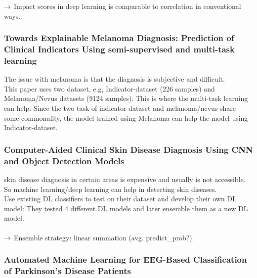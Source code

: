 $\rightarrow$ Impact scores in deep learning is comparable to correlation in conventional ways.

\subsubsection{Towards Explainable Melanoma Diagnosis: Prediction of Clinical Indicators Using semi-supervised and multi-task learning}


The issue with melanoma is that the diagnosis is subjective and difficult.\\

This paper uses two dataset, e.g,  Indicator-dataset (226 samples) and Melanoma/Nevus datasets (9124 samples). This is where the multi-task learning can help. Since the two task of indicator-dataset and melanoma/nevus share some commonality, the model trained using Melanoma can help the model using Indicator-dataset. 


\subsubsection{Computer-Aided Clinical Skin Disease Diagnosis Using CNN and Object Detection Models}

skin disease diagnosis in certain areas is expensive and usually is not accessible. So machine learning/deep learning can help in detecting skin diseases.\\

Use existing DL classifiers to test on their dataset and develop their own DL model: They tested 4 different DL models and later ensemble them as a new DL model.\\

\\

$\rightarrow$ Ensemble strategy: linear summation (avg. predict\_prob?).


\subsubsection{Automated Machine Learning for EEG-Based Classification of Parkinson's Disease Patients}

